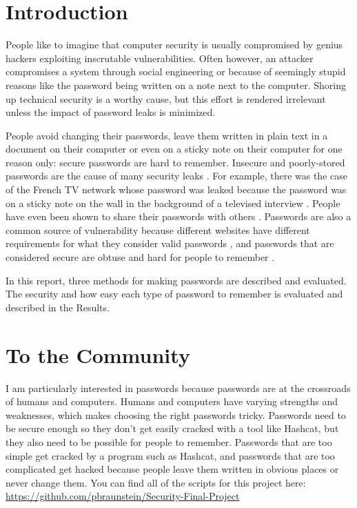 \documentclass{article}
\begin{document}
\section*{Introduction}
People like to imagine that computer security is usually compromised by genius hackers exploiting inscrutable vulnerabilities. Often however, an attacker compromises a system through social engineering \cite{social} or because of seemingly stupid reasons like the password being written on a note next to the computer. Shoring up technical security is a worthy cause, but this effort is rendered irrelevant unless the impact of password leaks is minimized.

People avoid changing their passwords, leave them written in plain text in a document on their computer or even on a sticky note on their computer for one reason only: secure passwords are hard to remember. Insecure and poorly-stored passwords are the cause of many security leaks \cite{stupid}. For example, there was the case of the French TV network whose password was leaked because the password was on a sticky note on the wall in the background of a televised interview \cite{tv}. People have even been shown to share their passwords with others \cite{share}. Passwords are also a common source of vulnerability because different websites have different requirements for what they consider valid passwords \cite{diff}, and passwords that are considered secure are obtuse and hard for people to remember \cite{remem}.

In this report, three methods for making passwords are described and evaluated. The security and how easy each type of password to remember is evaluated and described in the Results.

\section*{To the Community}
I am particularly interested in passwords because passwords are at the crossroads of humans and computers. Humans and computers have varying strengths and weaknesses, which makes choosing the right passwords tricky. Passwords need to be secure enough so they don't get easily cracked with a tool like Hashcat, but they also need to be possible for people to remember. Passwords that are too simple get cracked by a program such as Hashcat, and passwords that are too complicated get hacked because people leave them written in obvious places or never change them. You can find all of the scripts for this project here: \url{https://github.com/pbraunstein/Security-Final-Project}
\end{document}
